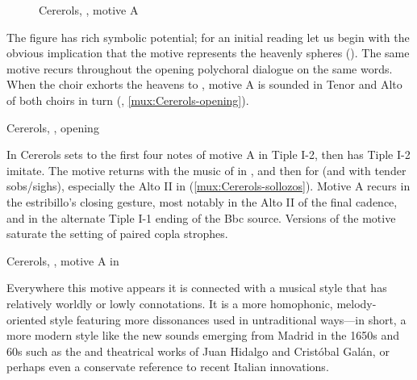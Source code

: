 \begin{figure}
    \caption{Cererols, , motive A}
    \label{fig:Cererols-motiveA}
\end{figure}

The figure has rich symbolic potential; for an initial reading let us begin with
the obvious implication that the motive represents the heavenly spheres
().
The same motive recurs throughout the opening polychoral dialogue on the same
words.
When the choir exhorts the heavens to , motive A is
sounded in Tenor and Alto of both choirs in turn (,
\cref{mux:Cererols-opening}).

\begin{musicexample}
    \caption{Cererols, , opening}
    \label{mux:Cererols-opening}
\end{musicexample}

In  Cererols sets  to the
first four notes of motive A in Tiple I-2, then has Tiple I-2 imitate.
The motive returns with the music of  in
, and then for  (and with
tender sobs/sighs), especially the Alto II in 
(\cref{mux:Cererols-sollozos}). 
Motive A recurs in the estribillo's closing gesture, most notably in the Alto II
of the final cadence, and in the alternate Tiple I-1 ending of the Bbc source.
Versions of the motive saturate the setting of paired copla strophes.

\begin{musicexample}
    \caption{Cererols, , motive A in 
    }
    \label{mux:Cererols-sollozos}
\end{musicexample}

Everywhere this motive appears it is connected with a musical style that has
relatively worldly or lowly connotations.
It is a more homophonic, melody-oriented style featuring more dissonances used
in untraditional ways---in short, a more modern style like the new sounds
emerging from Madrid in the 1650s and 60s such as the  and
theatrical works of Juan Hidalgo and Cristóbal Galán, or perhaps even a
conservate reference to recent Italian innovations.

